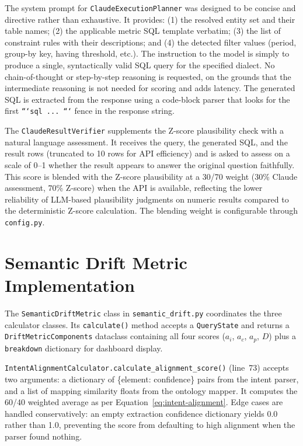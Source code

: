 \documentclass[12pt,a4paper]{report}
\begin{document}
The system prompt for \texttt{ClaudeExecutionPlanner} was designed to be concise and directive rather than exhaustive. It provides: (1) the resolved entity set and their table names; (2) the applicable metric SQL template verbatim; (3) the list of constraint rules with their descriptions; and (4) the detected filter values (period, group-by key, having threshold, etc.). The instruction to the model is simply to produce a single, syntactically valid \ac{SQL} query for the specified dialect. No chain-of-thought or step-by-step reasoning is requested, on the grounds that the intermediate reasoning is not needed for scoring and adds latency. The generated SQL is extracted from the response using a code-block parser that looks for the first \texttt{```sql ... ```} fence in the response string.

The \texttt{ClaudeResultVerifier} supplements the Z-score plausibility check with a natural language assessment. It receives the query, the generated SQL, and the result rows (truncated to 10 rows for API efficiency) and is asked to assess on a scale of 0--1 whether the result appears to answer the original question faithfully. This score is blended with the Z-score plausibility at a 30/70 weight (30\% Claude assessment, 70\% Z-score) when the API is available, reflecting the lower reliability of LLM-based plausibility judgments on numeric results compared to the deterministic Z-score calculation. The blending weight is configurable through \texttt{config.py}.

\section{Semantic Drift Metric Implementation}
\label{sec:drift-impl}

The \texttt{SemanticDriftMetric} class in \texttt{semantic\_drift.py} coordinates the three calculator classes. Its \texttt{calculate()} method accepts a \texttt{QueryState} and returns a \texttt{DriftMetricComponents} dataclass containing all four scores ($a_i$, $a_c$, $a_p$, $D$) plus a \texttt{breakdown} dictionary for dashboard display.

\texttt{IntentAlignmentCalculator.calculate\_alignment\_score()} (line~73) accepts two arguments: a dictionary of \{element: confidence\} pairs from the intent parser, and a list of mapping similarity floats from the ontology mapper. It computes the 60/40 weighted average as per Equation~\ref{eq:intent-alignment}. Edge cases are handled conservatively: an empty extraction confidence dictionary yields 0.0 rather than 1.0, preventing the score from defaulting to high alignment when the parser found nothing.
\end{document}
